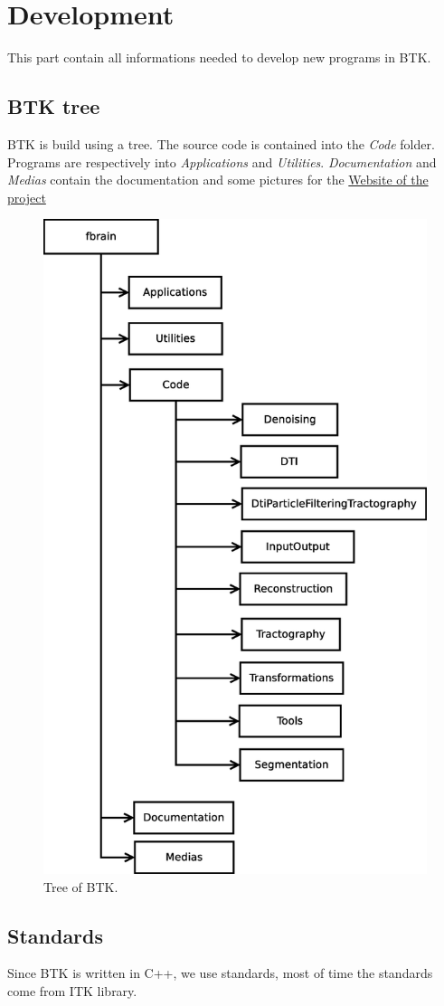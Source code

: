     \section{Development}
    This part contain all informations needed to develop new programs in BTK.

    \subsection{BTK tree}
    BTK is build using a tree.
    The source code is contained into the \textit{Code} folder.
    Programs are respectively into \textit{Applications} and \textit{Utilities}.
    \textit{Documentation} and \textit{Medias} contain the documentation and some pictures for the \href{http://rousseau.github.com/fbrain/}{Website of the project}

    \begin{figure}[H]
     \centering
      \includegraphics[height=0.5\textwidth]{Btk_tree.eps}
      \caption{Tree of BTK.}
    \end{figure}

    \subsection{Standards}
    Since BTK is written in C++, we use standards, most of time the standards come from ITK library.\\

